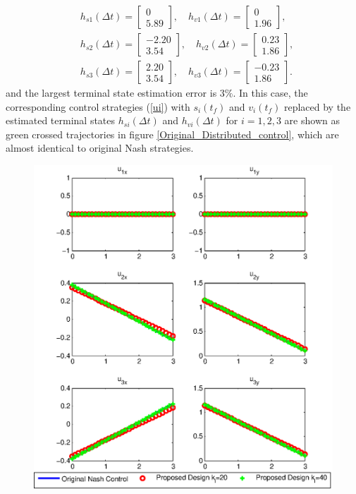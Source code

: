 \documentclass[12pt,draftcls,onecolumn]{IEEEtran}  %
\begin{document}
{\begin{align*}
&h_{s1}(\Delta t)=\begin{bmatrix}
 0\\
    5.89
\end{bmatrix},\quad h_{v1}(\Delta t)=\begin{bmatrix}
   0\\
    1.96
\end{bmatrix},\\
&h_{s2}(\Delta t)=\begin{bmatrix}
 -2.20\\    3.54
\end{bmatrix},\quad h_{v2}(\Delta t)=\begin{bmatrix}
 0.23\\
    1.86
\end{bmatrix},\\
&h_{s3}(\Delta t)=\begin{bmatrix}
 2.20\\3.54
\end{bmatrix},\quad h_{v3}(\Delta t)=\begin{bmatrix}
-0.23\\    1.86
\end{bmatrix}.
\end{align*}
and the largest terminal state estimation error is $3\%$. In this case, the corresponding control strategies (\ref{ui}) with $s_i(t_f)$ and $v_i(t_f)$ replaced by the estimated terminal states $h_{si}(\Delta t)$ and $h_{vi}(\Delta t)$ for $i=1,2,3$ are shown as green crossed trajectories in figure \ref{Original_Distributed_control}, which are almost identical to original Nash strategies.
\begin{figure}[h]
      \centering
      \includegraphics[scale=0.58]{Original_Distributed_control.eps}

\end{figure}}
\end{document}
